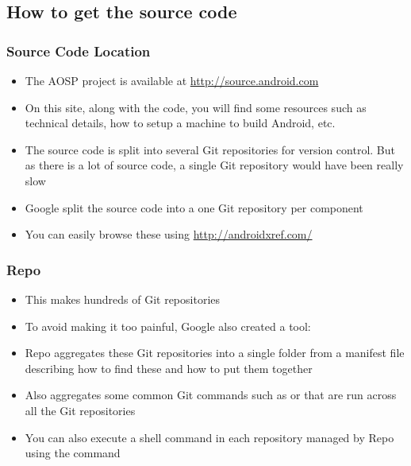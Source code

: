 \subsection{How to get the source code}
\begin{frame}
  \frametitle{Source Code Location}
  \begin{itemize}
  \item The AOSP project is available at
    \url{http://source.android.com}
  \item On this site, along with the code, you will find some resources
    such as technical details, how to setup a machine to build
    Android, etc.
  \item The source code is split into several Git repositories for
    version control. But as there is a lot of source code, a single
    Git repository would have been really slow
  \item Google split the source code into a one Git repository per
    component
  \item You can easily browse these using
    \url{http://androidxref.com/}
  \end{itemize}
\end{frame}

\begin{frame}
  \frametitle{Repo}
  \begin{itemize}
  \item This makes hundreds of Git repositories\!
  \item To avoid making it too painful, Google also created a tool:
  \item Repo aggregates these Git repositories into a single folder
    from a manifest file describing how to find these and how to put
    them together
  \item Also aggregates some common Git commands such as 
    or  that are run across all the Git repositories
  \item You can also execute a shell command in each repository
    managed by Repo using the  command
  \end{itemize}
\end{frame}

